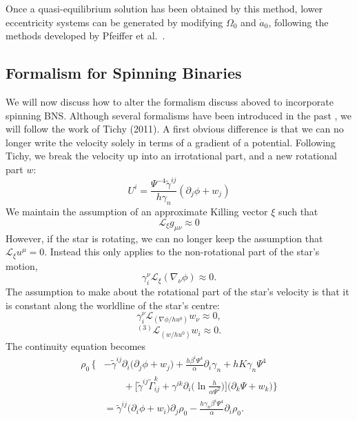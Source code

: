\documentclass[aps,prd,amsmath,floatfix
,twocolumn
,superscriptaddress,nofootinbib,showpacs]{revtex4-1}
\theoremstyle{plain} \newtheorem{thm}{Theorem} \newtheorem{lem}{Lemma}
\begin{document}
Once a quasi-equilibrium solution has been obtained by this method,
lower eccentricity systems can be generated by modifying $\Omega_0$
and $\dot{a}_0$, following the methods developed by Pfeiffer et
al.~\cite{Pfeiffer-Brown-etal:2007}.

\subsection{Formalism for Spinning Binaries}
We will now discuss how to alter the formalism discuss aboved to
incorporate spinning BNS. Although several formalisms have been
introduced in the past \cite{Marronetti:2003gk}\cite{Baumgarte:2009fw}, we will
follow the work of Tichy (2011)\cite{Tichy:2011gw}. A
first obvious difference is that we can no longer write the velocity
solely in terms of a gradient of a potential. Following Tichy, we
break the velocity up into an irrotational part, and a new rotational
part $w$:
\begin{equation}
U^i =
\frac{\Psi^{-4}\tilde{\gamma}^{ij}}{h\gamma_n}\left(\partial_j\phi+w_j\right)
\end{equation}
We maintain the assumption of an approximate Killing vector $\xi$ such
that
\begin{equation}
\mathcal{L}_{\xi}g_{\mu\nu}\approx 0
\end{equation}
However, if the star is rotating, we can no longer keep the assumption
that $\mathcal{L}_{\xi}u^{\mu}=0$. Instead this only applies to the
non-rotational part of the star's motion,
\begin{equation}
\gamma^{\nu}_i\mathcal{L}_{\xi}\left(\nabla_{\nu}\phi\right)\approx 0.
\end{equation}
The assumption to make about the rotational part of the star's
velocity is that it is constant along the worldline of the star's
centre:
\begin{equation}
\gamma^{\nu}_{i}\mathcal{L}_{\left(\nabla\phi/hu^0\right)}w_{\nu}\approx 0,
\end{equation}
\begin{equation}
^{(3)}\mathcal{L}_{\left(w/hu^0\right)}w_i\approx 0.
\end{equation}
The continuity equation becomes
\begin{align}
\rho_0\,\bigg\{\!\!&-\tilde{\gamma}^{ij}\partial_i\big(\partial_j\phi+w_j\big)  + \frac{h\beta^i\Psi^4}{\alpha}\partial_i\gamma_n + hK\gamma_n\Psi^4 \nonumber\\
&\qquad+\Big[\tilde{\gamma}^{ij}\tilde{\Gamma}^k_{ij}+\gamma^{ik}\partial_i\big(\ln \frac{h}{\alpha\Psi^2}\big)\Big] 
\big(\partial_k\Psi+w_k\big) \bigg\} \nonumber \\
&=\tilde{\gamma}^{ij}\big(\partial_i\phi+w_i\big)\partial_j\rho_0 - \frac{h\gamma_n\beta^i\Psi^4}{\alpha}\partial_i\rho_0.
\label{eq:Continuity}
\end{align}
\end{document}
